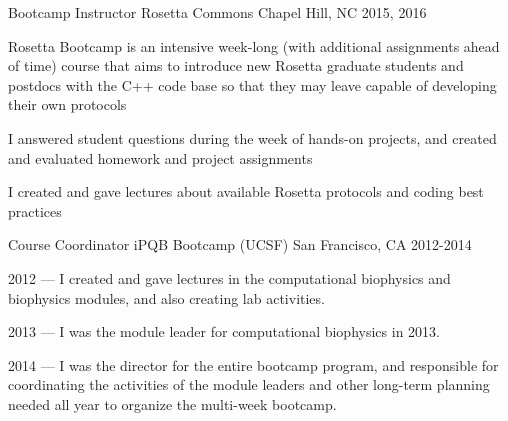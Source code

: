 

\begin{cventries}

  \cventry
  {Bootcamp Instructor} %
  {Rosetta Commons} %
  {Chapel Hill, NC} %
  {2015, 2016} %
  {
    \begin{cvitems} %
    \item Rosetta Bootcamp is an intensive week-long (with additional assignments ahead of time) course
      that aims to introduce new Rosetta graduate students and postdocs with the C++ code base so that they may leave capable
      of developing their own protocols
    \item I answered student questions during the week of hands-on projects, and created and evaluated homework and project assignments
    \item I created and gave lectures about available Rosetta protocols and coding best practices
    \end{cvitems}
  }

  \cventry
  {Course Coordinator} %
  {iPQB Bootcamp (UCSF)} %
  {San Francisco, CA} %
  {2012-2014} %
  {
    \begin{cvitems} %
    \item {2012 --- I created and gave lectures in the computational biophysics and biophysics modules, and also creating lab activities.}
    \item {2013 --- I was the module leader for computational biophysics in 2013.}
    \item {2014 --- I was the director for the entire bootcamp program, and responsible for coordinating the activities of the module leaders and other long-term planning needed all year to organize the multi-week bootcamp.}
    \end{cvitems}
  }


\end{cventries}
